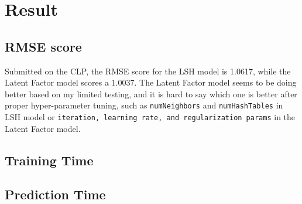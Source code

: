 \documentclass{scrartcl}
\begin{document}
\section{Result}
\subsection{RMSE score}
Submitted on the CLP, the RMSE score for the LSH model is 1.0617, while the Latent Factor model scores a $1.0037$. The Latent Factor model seems to be doing better based on my limited testing, and it is hard to say which one is better after proper hyper-parameter tuning, such as \texttt{numNeighbors} and \texttt{numHashTables} in LSH model or \texttt{iteration, learning rate, and regularization params} in the Latent Factor model.
\subsection{Training Time}
\subsection{Prediction Time}
\end{document}
